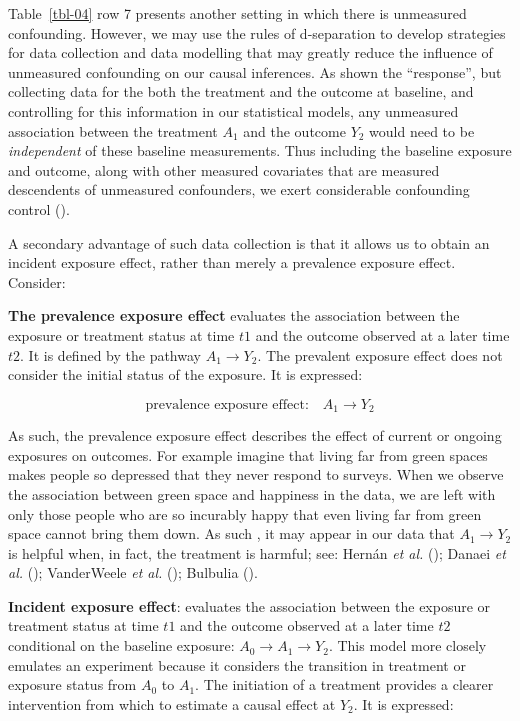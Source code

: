 \documentclass[
  singlecolumn]{article}
\begin{document}
Table~\ref{tbl-04} row 7 presents another setting in which there is
unmeasured confounding. However, we may use the rules of d-separation to
develop strategies for data collection and data modelling that may
greatly reduce the influence of unmeasured confounding on our causal
inferences. As shown the ``response'', but collecting data for the both
the treatment and the outcome at baseline, and controlling for this
information in our statistical models, any unmeasured association
between the treatment \(A_1\) and the outcome \(Y_2\) would need to be
\emph{independent} of these baseline measurements. Thus including the
baseline exposure and outcome, along with other measured covariates that
are measured descendents of unmeasured confounders, we exert
considerable confounding control
().

A secondary advantage of such data collection is that it allows us to
obtain an incident exposure effect, rather than merely a prevalence
exposure effect. Consider:

\textbf{The prevalence exposure effect} evaluates the association
between the exposure or treatment status at time \(t1\) and the outcome
observed at a later time \(t2\). It is defined by the pathway
\(A_{1} \to Y_{2}\). The prevalent exposure effect does not consider the
initial status of the exposure. It is expressed:

\[
\text{prevalence exposure effect:} \quad A_{1} \to Y_{2}
\]

As such, the prevalence exposure effect describes the effect of current
or ongoing exposures on outcomes. For example imagine that living far
from green spaces makes people so depressed that they never respond to
surveys. When we observe the association between green space and
happiness in the data, we are left with only those people who are so
incurably happy that even living far from green space cannot bring them
down. As such , it may appear in our data that \(A_{1} \to Y_{2}\) is
helpful when, in fact, the treatment is harmful; see: Hernán \emph{et
al.} (); Danaei \emph{et al.}
(); VanderWeele \emph{et al.}
(); Bulbulia
().

\textbf{Incident exposure effect}: evaluates the association between the
exposure or treatment status at time \(t1\) and the outcome observed at
a later time \(t2\) conditional on the baseline exposure:
\(A_{0} \to A_{1} \to Y_{2}\). This model more closely emulates an
experiment because it considers the transition in treatment or exposure
status from \(A_0\) to \(A_1\). The initiation of a treatment provides a
clearer intervention from which to estimate a causal effect at \(Y_2\).
It is expressed:
\end{document}
